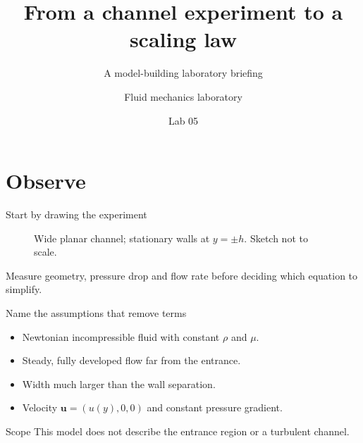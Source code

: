 \documentclass[11pt,aspectratio=169]{beamer}
\title[Channel flow]{From a channel experiment to a scaling law}
\subtitle{A model-building laboratory briefing}
\author{Fluid mechanics laboratory}
\institute{Dimensional analysis workshop}
\date{Lab 05}
\begin{document}
\begin{frame}[plain]\titlepage\end{frame}
\section{Observe}
\begin{frame}{Start by drawing the experiment}
\begin{figure}
\centering
{}
\caption{Wide planar channel; stationary walls at $y=\pm h$. Sketch not to scale.}
\end{figure}
Measure geometry, pressure drop and flow rate before deciding which equation to simplify.
\end{frame}
\begin{frame}{Name the assumptions that remove terms}
\begin{itemize}[<+->]
\item Newtonian incompressible fluid with constant $\rho$ and $\mu$.
\item Steady, fully developed flow far from the entrance.
\item Width much larger than the wall separation.
\item Velocity $\mathbf{u}=(u(y),0,0)$ and constant pressure gradient.
\end{itemize}
\begin{alertblock}{Scope}
This model does not describe the entrance region or a turbulent channel.
\end{alertblock}
\end{frame}
\end{document}

